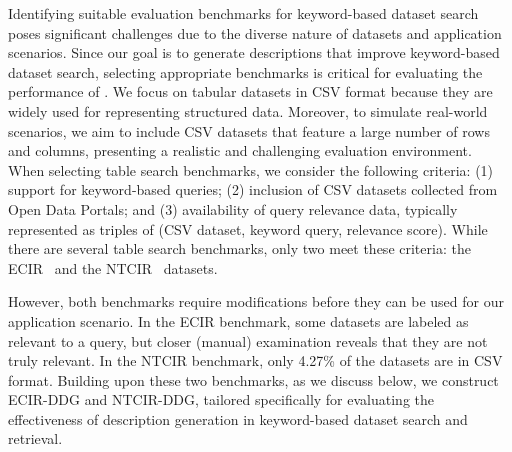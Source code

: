 \noindent Identifying suitable evaluation benchmarks for keyword-based dataset search poses significant challenges due to the diverse nature of datasets and application scenarios. Since our goal is to generate descriptions that improve keyword-based dataset search, selecting appropriate benchmarks is critical for evaluating the performance of \SystemName.
% 
We focus on tabular datasets in CSV format because they are widely used for representing structured data. Moreover, to simulate real-world scenarios, we aim to include CSV datasets that feature a large number of rows and columns, presenting a  realistic and challenging evaluation environment.
% 
When selecting table search benchmarks, we consider the following criteria: (1) support for keyword-based queries; (2) inclusion of CSV datasets collected from Open Data Portals; and (3) availability of query relevance data, typically represented as triples of (CSV dataset, keyword query, relevance score).
% 
While there are several table search benchmarks\cite{lin2022acordar1, chen2024acordar2, hulsebos2023gittables, chen2021wtr, zhang2018semsearch, zhang2021semantic, leventidis2024STSD, ji2024target}, only two meet these criteria:
%
the ECIR~\cite{chen2020ecir} and the NTCIR~\cite{kato2021ntcir} datasets.

However, both benchmarks require modifications before they can be used for our application scenario. In the ECIR benchmark, some datasets are labeled as relevant to a query, but closer (manual) examination reveals that they are not truly relevant. In the NTCIR benchmark, only 4.27\% of the datasets are in CSV format.
% 
Building upon these two benchmarks, as we discuss below, we construct ECIR-DDG and NTCIR-DDG, tailored specifically for evaluating the effectiveness of description generation in keyword-based dataset search and retrieval.

